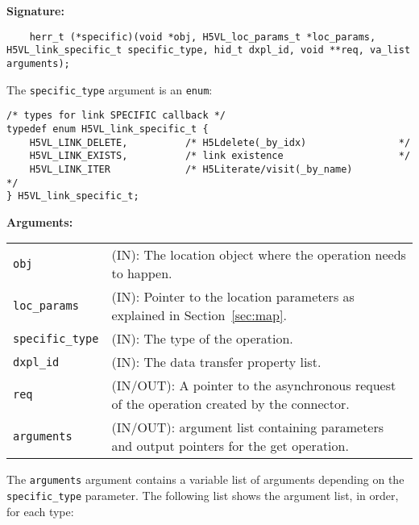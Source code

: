 \begin{mdframed}[style=bgbox]
\textbf{Signature:}
\begin{lstlisting}
	herr_t (*specific)(void *obj, H5VL_loc_params_t *loc_params, H5VL_link_specific_t specific_type, hid_t dxpl_id, void **req, va_list arguments);
\end{lstlisting}

The \texttt{specific\_type} argument is an \texttt{enum}:
\begin{lstlisting}
/* types for link SPECIFIC callback */
typedef enum H5VL_link_specific_t {                                              
    H5VL_LINK_DELETE,          /* H5Ldelete(_by_idx)                */           
    H5VL_LINK_EXISTS,          /* link existence                    */           
    H5VL_LINK_ITER             /* H5Literate/visit(_by_name)              */     
} H5VL_link_specific_t; 
\end{lstlisting}

\textbf{Arguments:}\\
\begin{tabular}{l p{13.5cm}}
  \texttt{obj} & (IN): The location object  where the operation needs to happen.\\
  \texttt{loc\_params} & (IN): Pointer to the location parameters as explained in Section~\ref{sec:map}.\\
  \texttt{specific\_type} & (IN): The type of the operation.\\
  \texttt{dxpl\_id} & (IN): The data transfer property list.\\
  \texttt{req} & (IN/OUT): A pointer to the asynchronous request of the
  operation created by the connector.\\
  \texttt{arguments} & (IN/OUT): argument list containing parameters and
  output pointers for the get operation. \\
\end{tabular}
\end{mdframed}

The \texttt{arguments} argument contains a variable list of arguments
depending on the \texttt{specific\_type} parameter. The following list shows
the argument list, in order, for each type:


